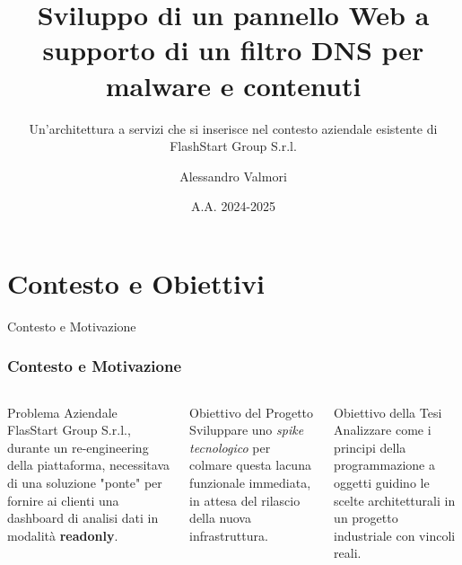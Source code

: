 \documentclass[8pt]{beamer}
\title{Sviluppo di un pannello Web a supporto di un filtro DNS per malware e contenuti}
\subtitle{Un'architettura a servizi che si inserisce nel contesto aziendale esistente di FlashStart Group S.r.l.}
\date{A.A. 2024-2025}
\author{Alessandro Valmori}
\institute{Università di Bologna \and Relatore: Prof. Mirko Viroli \and Correlatore: Dott. Nicolas Farabegoli}
\begin{document}
\maketitle



\section{Contesto e Obiettivi}

\begin{frame}{Contesto e Motivazione}
    \frametitle{Contesto e Motivazione}
    
    \begin{columns}[T]
            \begin{block}{Problema Aziendale}
                FlasStart Group S.r.l., durante un re-engineering della piattaforma, necessitava di una soluzione "ponte" per fornire ai clienti una dashboard di analisi dati in modalità \textbf{readonly}.
            \end{block}
            
            \begin{block}{Obiettivo del Progetto}
                Sviluppare uno \textit{spike tecnologico} per colmare questa lacuna funzionale immediata, in attesa del rilascio della nuova infrastruttura.
            \end{block}
            
            \begin{alertblock}{Obiettivo della Tesi}
                Analizzare come i principi della programmazione a oggetti guidino le scelte architetturali in un progetto industriale con vincoli reali.
            \end{alertblock}


\end{columns}
\end{frame}
\end{document}

